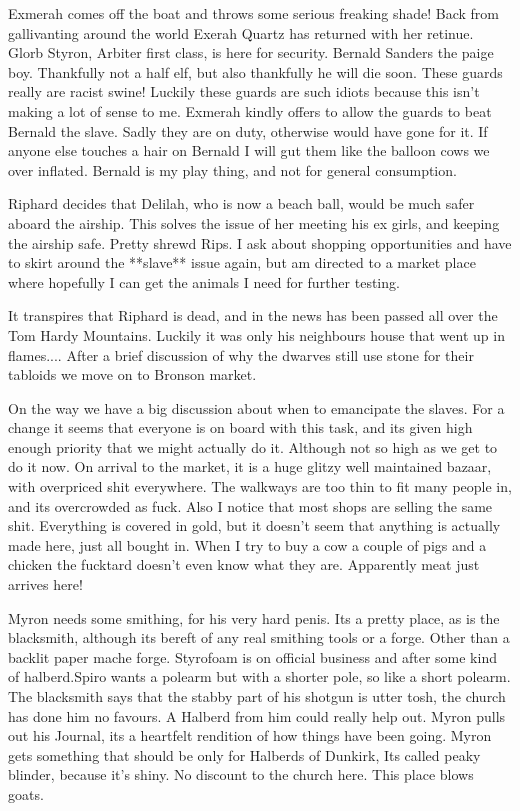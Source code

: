Exmerah comes off the boat and throws some serious freaking shade! Back from gallivanting around the world Exerah Quartz has returned with her retinue. Glorb Styron, Arbiter first class, is here for security. Bernald Sanders the paige boy. Thankfully not a half elf, but also thankfully he will die soon. These guards really are racist swine! Luckily these guards are such idiots because this isn’t making a lot of sense to me. Exmerah kindly offers to allow the guards to beat Bernald the slave. Sadly they are on duty, otherwise would have gone for it. If anyone else touches a hair on Bernald I will gut them like the balloon cows we over inflated. Bernald is my play thing, and not for general consumption.\medskip

Riphard decides that Delilah, who is now a beach ball, would be much safer aboard the airship. This solves the issue of her meeting his ex girls, and keeping the airship safe. Pretty shrewd Rips. I ask about shopping opportunities and have to skirt around the **slave** issue again, but am directed to a market place where hopefully I can get the animals I need for further testing.\medskip

It transpires that Riphard is dead, and in the news has been passed all over the Tom Hardy Mountains. Luckily it was only his neighbours house that went up in flames.... After a brief discussion of why the dwarves still use stone for their tabloids we move on to Bronson market.\medskip

On the way we have a big discussion about when to emancipate the slaves. For a change it seems that everyone is on board with this task, and its given high enough priority that we might actually do it. Although not so high as we get to do it now. On arrival to the market, it is a huge glitzy well maintained bazaar, with overpriced shit everywhere. The walkways are too thin to fit many people in, and its overcrowded as fuck. Also I notice that most shops are selling the same shit. Everything is covered in gold, but it doesn't seem that anything is actually made here, just all bought in. When I try to buy a cow a couple of pigs and a chicken the fucktard doesn't even know what they are. Apparently meat just arrives here!\medskip

Myron needs some smithing, for his very hard penis. Its a pretty place, as is the blacksmith, although its bereft of any real smithing tools or a forge. Other than a backlit paper mache forge. Styrofoam is on official business and after some kind of halberd.Spiro wants a polearm but with a shorter pole, so like a short polearm. The blacksmith says that the stabby part of his shotgun is utter tosh, the church has done him no favours. A Halberd from him could really help out. Myron pulls out his Journal, its a heartfelt rendition of how things have been going. Myron gets something that should be only for Halberds of Dunkirk, Its called peaky blinder, because it's shiny. No discount to the church here. This place blows goats.\medskip


